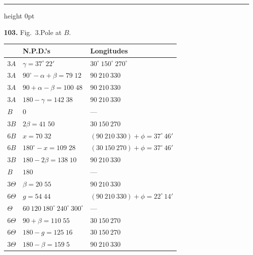 \documentclass[11pt,a4paper]{article}
\newcommand{\artno}[1]{\textbf{#1.}\quad}
\begin{document}
\bigskip
\hrule height 0pt
\bigskip

\artno{103} Fig.~3.\quad Pole at $B$.
\begin{center}
\end{center}

\begin{center}
\small
\begin{tabular}{l@{\qquad}l@{\qquad}l}
 & N.P.D.'s & Longitudes\\\hline
$3A$        & $\gamma = 37^{\circ}\,22'$            & $30^{\circ}\ 150^{\circ}\ 270^{\circ}$\\
$3A$        & $90^{\circ} - \alpha + \beta = 79\;12$ & $90\ 210\ 330$\\
$3A$        & $90 + \alpha - \beta = 100\;48$       & $90\ 210\ 330$\\
$3A$        & $180 - \gamma = 142\;38$              & $90\ 210\ 330$\\
$B$         & $0$                                  & ---\\
$3B$        & $2\beta = 41\;50$                     & $30\ 150\ 270$\\
$6B$        & $x = 70\;32$                          & $(90\ 210\ 330) + \phi = 37^{\circ}\,46'$\\
$6B$        & $180^{\circ} - x = 109\;28$           & $(30\ 150\ 270) + \phi = 37^{\circ}\,46'$\\
$3B$        & $180 - 2\beta = 138\;10$              & $90\ 210\ 330$\\
$B$         & $180$                                & ---\\
$3\Theta$   & $\beta = 20\;55$                      & $90\ 210\ 330$\\
$6\Theta$   & $g = 54\;44$                          & $(90\ 210\ 330) + \phi = 22^{\circ}\,14'$\\
$\Theta$    & $60\ 120\ 180^{\circ}\ 240^{\circ}\ 300^{\circ}$ & ---\\
$6\Theta$   & $90 + \beta = 110\;55$                & $30\ 150\ 270$\\
$6\Theta$   & $180 - g = 125\;16$                   & $30\ 150\ 270$\\
$3\Theta$   & $180 - \beta = 159\;5$                & $90\ 210\ 330$\\
\end{tabular}
\end{center}
\normalsize
\end{document}
